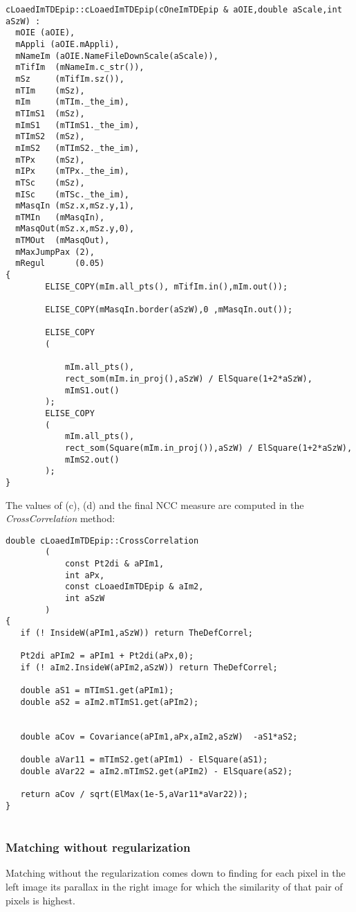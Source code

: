 \begin{lstlisting}
cLoaedImTDEpip::cLoaedImTDEpip(cOneImTDEpip & aOIE,double aScale,int aSzW) :
  mOIE (aOIE),
  mAppli (aOIE.mAppli),
  mNameIm (aOIE.NameFileDownScale(aScale)),
  mTifIm  (mNameIm.c_str()),
  mSz     (mTifIm.sz()),
  mTIm    (mSz),
  mIm     (mTIm._the_im),
  mTImS1  (mSz),
  mImS1   (mTImS1._the_im),
  mTImS2  (mSz),
  mImS2   (mTImS2._the_im),
  mTPx    (mSz),
  mIPx    (mTPx._the_im),
  mTSc    (mSz),
  mISc    (mTSc._the_im),
  mMasqIn (mSz.x,mSz.y,1),
  mTMIn   (mMasqIn),
  mMasqOut(mSz.x,mSz.y,0),
  mTMOut  (mMasqOut),
  mMaxJumpPax (2),
  mRegul      (0.05)
{
        ELISE_COPY(mIm.all_pts(), mTifIm.in(),mIm.out());

        ELISE_COPY(mMasqIn.border(aSzW),0 ,mMasqIn.out());

        ELISE_COPY
        (

            mIm.all_pts(),
            rect_som(mIm.in_proj(),aSzW) / ElSquare(1+2*aSzW),
            mImS1.out()
        );
        ELISE_COPY
        (
            mIm.all_pts(),
            rect_som(Square(mIm.in_proj()),aSzW) / ElSquare(1+2*aSzW),
            mImS2.out()
        );
}
\end{lstlisting}

\noindent The values of (c), (d) and the final NCC measure are computed in the \emph{CrossCorrelation} method:

\begin{lstlisting}
double cLoaedImTDEpip::CrossCorrelation
        (
            const Pt2di & aPIm1,
            int aPx,
            const cLoaedImTDEpip & aIm2,
            int aSzW
        )
{
   if (! InsideW(aPIm1,aSzW)) return TheDefCorrel;

   Pt2di aPIm2 = aPIm1 + Pt2di(aPx,0);
   if (! aIm2.InsideW(aPIm2,aSzW)) return TheDefCorrel;

   double aS1 = mTImS1.get(aPIm1);
   double aS2 = aIm2.mTImS1.get(aPIm2);


   double aCov = Covariance(aPIm1,aPx,aIm2,aSzW)  -aS1*aS2;

   double aVar11 = mTImS2.get(aPIm1) - ElSquare(aS1);
   double aVar22 = aIm2.mTImS2.get(aPIm2) - ElSquare(aS2);

   return aCov / sqrt(ElMax(1e-5,aVar11*aVar22));
}


\end{lstlisting}

 
\subsubsection{Matching without regularization}
Matching without the regularization comes down to finding for each pixel in the left image its parallax in the right image for which the similarity of that pair of pixels is highest.\newline

